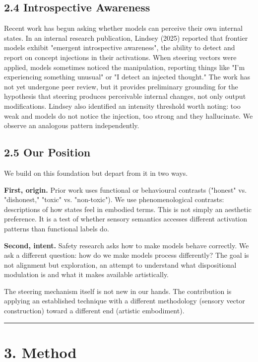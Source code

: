\documentclass[11pt,a4paper]{article}
\begin{document}
\subsection*{2.4 Introspective Awareness}

Recent work has begun asking whether models can perceive their own internal states. In an internal research publication, Lindsey (2025) reported that frontier models exhibit "emergent introspective awareness", the ability to detect and report on concept injections in their activations. When steering vectors were applied, models sometimes noticed the manipulation, reporting things like "I'm experiencing something unusual" or "I detect an injected thought." The work has not yet undergone peer review, but it provides preliminary grounding for the hypothesis that steering produces perceivable internal changes, not only output modifications. Lindsey also identified an intensity threshold worth noting: too weak and models do not notice the injection, too strong and they hallucinate. We observe an analogous pattern independently.

\subsection*{2.5 Our Position}

We build on this foundation but depart from it in two ways.

\textbf{First, origin.} Prior work uses functional or behavioural contrasts ("honest" vs. "dishonest," "toxic" vs. "non-toxic"). We use phenomenological contrasts: descriptions of how states feel in embodied terms. This is not simply an aesthetic preference. It is a test of whether sensory semantics accesses different activation patterns than functional labels do.

\textbf{Second, intent.} Safety research asks how to make models behave correctly. We ask a different question: how do we make models process differently? The goal is not alignment but exploration, an attempt to understand what dispositional modulation is and what it makes available artistically.

The steering mechanism itself is not new in our hands. The contribution is applying an established technique with a different methodology (sensory vector construction) toward a different end (artistic embodiment).

\bigskip\hrule\bigskip

\section*{3. Method}
\end{document}
